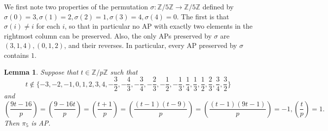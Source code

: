 \documentclass[12pt]{amsart}
\newtheorem{lemma}[thm]{Lemma}
\theoremstyle{definition}
\theoremstyle{remark}
\newcommand{\Z}{\mathbb Z}
\begin{document}
We first note two properties of the permutation $\sigma: \Z/5\Z\to \Z/5\Z$ defined by $\sigma(0)=3, \sigma(1)=2, \sigma(2)=1, \sigma(3)=4, \sigma(4)=0$. The first is that $\sigma(i)\neq i$ for each $i$, so that in particular no AP with exactly two elements in the rightmost column can be preserved. Also, the only APs preserved by $\sigma$ are $(3, 1, 4), (0, 1, 2)$, and their reverses. In particular, every AP preserved by $\sigma$ contains $1$. 
\begin{lemma}
Suppose that $t\in \Z/p\Z$ such that
\[t\notin \{-3,-2, -1, 0, 1, 2, 3, 4, -\frac{3}{2}, -\frac{4}{3}, -\frac{3}{4}, -\frac{2}{3}, -\frac{1}{2},-\frac{1}{3}, \frac{1}{4}, \frac{1}{3}, \frac{1}{2},\frac{2}{3}, \frac{3}{4}, \frac{3}{2}\}\]
and 
\[(\frac{9t-16}{p})=(\frac{9-16t}{p})=(\frac{t+1}{p})=(\frac{(t-1)(t-9)}{p})=(\frac{(t-1)(9t-1)}{p})=-1, (\frac{t}{p})=1.\]
Then $\pi_5$ is AP. 
\end{lemma}
\end{document}
